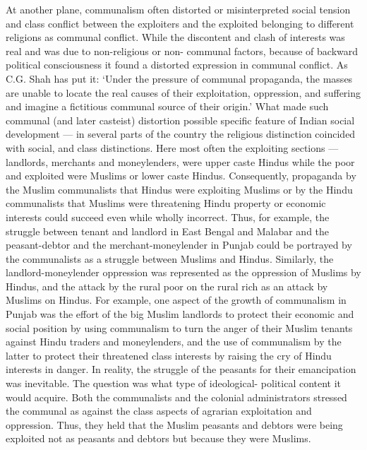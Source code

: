 At another plane, communalism often distorted or misinterpreted social tension and class conflict between the exploiters and the exploited belonging to different religions as communal conflict. While the discontent and clash of interests was real and was due to non-religious or non- communal factors, because of backward political consciousness it found a distorted expression in communal conflict. As C.G. Shah has put it: `Under the pressure of communal propaganda, the masses are unable to locate the real causes of their exploitation, oppression, and suffering and imagine a fictitious communal source of their origin.' What made such communal (and later casteist) distortion possible specific feature of Indian social development — in several parts of the country the religious distinction coincided with social, and class distinctions. Here most often the exploiting sections — landlords, merchants and moneylenders, were upper caste Hindus while the poor and exploited were Muslims or lower caste Hindus. Consequently, propaganda by the Muslim communalists that Hindus were exploiting Muslims or by the Hindu communalists that Muslims were threatening Hindu property or economic interests could succeed even while wholly incorrect. Thus, for example, the struggle between tenant and landlord in East Bengal and Malabar and the peasant-debtor and the merchant-moneylender in Punjab could be portrayed by the communalists as a struggle between Muslims and Hindus. Similarly, the landlord-moneylender oppression was represented as the oppression of Muslims by Hindus, and the attack by the rural poor on the rural rich as an attack by Muslims on Hindus. For example, one aspect of the growth of communalism in Punjab was the effort of the big Muslim landlords to protect their economic and social position by using communalism to turn the anger of their Muslim tenants against Hindu traders and moneylenders, and the use of communalism by the latter to protect their threatened class interests by raising the cry of Hindu interests in danger. In reality, the struggle of the peasants for their emancipation was inevitable. The question was what type of ideological- political content it would acquire. Both the communalists and the colonial administrators stressed the communal as against the class aspects of agrarian exploitation and oppression. Thus, they held that the Muslim peasants and debtors were being exploited not as peasants and debtors but because they were Muslims. 

